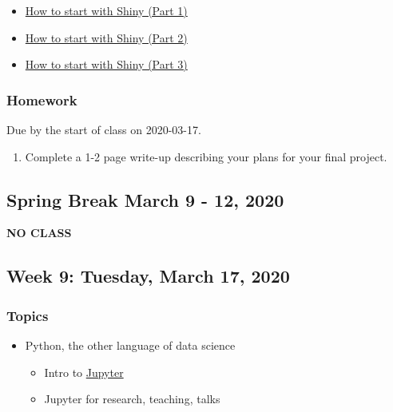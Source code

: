 \documentclass[
]{article}
\providecommand{\tightlist}{%
  \setlength{\itemsep}{0pt}\setlength{\parskip}{0pt}}
\begin{document}
\begin{itemize}
\tightlist
\item
  \href{https://www.rstudio.com/resources/webinars/how-to-start-with-shiny-part-1/}{How
  to start with Shiny (Part 1)}
\item
  \href{https://www.rstudio.com/resources/webinars/how-to-start-with-shiny-part-2/}{How
  to start with Shiny (Part 2)}
\item
  \href{https://www.rstudio.com/resources/webinars/how-to-start-with-shiny-part-3/}{How
  to start with Shiny (Part 3)}
\end{itemize}

\hypertarget{homework-7}{%
\subsubsection{Homework}\label{homework-7}}

Due by the start of class on 2020-03-17.

\begin{enumerate}
\def\labelenumi{\arabic{enumi}.}
\tightlist
\item
  Complete a 1-2 page write-up describing your plans for your final
  project.
\end{enumerate}

\hypertarget{spring-break-march-9---12-2020}{%
\subsection{Spring Break March 9 - 12,
2020}\label{spring-break-march-9---12-2020}}

\textbf{NO CLASS}

\hypertarget{week-9-tuesday-march-17-2020}{%
\subsection{Week 9: Tuesday, March 17,
2020}\label{week-9-tuesday-march-17-2020}}

\hypertarget{topics-8}{%
\subsubsection{Topics}\label{topics-8}}

\begin{itemize}
\tightlist
\item
  Python, the other language of data science

  \begin{itemize}
  \tightlist
  \item
    Intro to \href{http://jupyter.org/}{Jupyter}
  \item
    Jupyter for research, teaching, talks
  \end{itemize}
\end{itemize}
\end{document}
